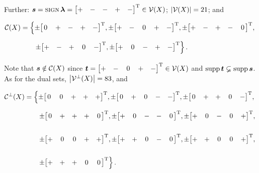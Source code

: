 \begin{Example}
        Further: \(\bm{s}=\operatorname{{\textsc{sign}}}\bm{\lambda}={\begin{bmatrix}+ & - & - & + & -\end{bmatrix}}^{\mathrm{T}}\in\mathcal{V}(X)\); \(\left\lvert\mathcal{V}(X)\right\rvert=21\); and

            \begin{align*}
                \mc C(X)
                    &=\left\{
                        \sv\ze+-+-,   \sv+-\ze+-,   \sv+-+-\ze, \snl
                        \sv+-+\ze-,   \sv+\ze-+-
                    \right\}.
            \end{align*}
            Note that \(\bm{s}\notin\mathcal{C}(X)\) since \(\ve t=\usv+-\ze+-\in\mc V(X)\) and \(\operatorname{supp}\bm{t}\varsubsetneq\operatorname{supp}\bm{s}\).  As for the dual sets, \(\left\lvert\mathcal{V}^\perp(X)\right\rvert=83\), and

            \begin{align*}
                \mc C^\perp(X)
                    &=\left\{
                        \sv\ze\ze+++,   \sv\ze+\ze--,   \sv\ze++\ze-,   \snl
                        \sv\ze+++\ze,   \sv+\ze--\ze,   \sv+\ze-\ze+,   \snl
                        \sv+\ze\ze++,   \sv++\ze-\ze,   \sv++\ze\ze+,   \snl
                        \sv+++\ze\ze
                    \right\}.
            \end{align*}
        \end{Example}

